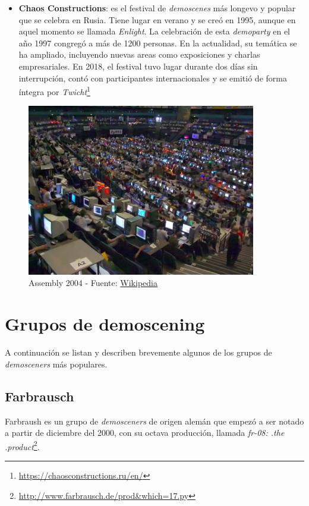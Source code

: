 \begin{itemize}
	\item \textbf{Chaos Constructions}: es el festival de \emph{demoscenes} más longevo y popular que se celebra en Rusia. Tiene lugar en verano y se creó en 1995, aunque en aquel momento se llamada \emph{Enlight}. La celebración de esta \emph{demoparty} en el año 1997 congregó a más de 1200 personas. En la actualidad, su temática se ha ampliado, incluyendo nuevas areas como exposiciones y charlas empresariales. En 2018, el festival tuvo lugar durante dos días sin interrupción, contó con participantes internacionales y se emitió de forma íntegra por \emph{Twicht}\footnote{\url{https://chaosconstructions.ru/en/}}
\end{itemize}

\begin{figure}[h]
	\centering
	\includegraphics[width=10cm]{archivos/Assembly2004}
	\caption{Assembly 2004 - Fuente: \href{https://en.wikipedia.org/wiki/Demoscene\#/media/File:Assembly2004-areena01.jpg}{Wikipedia}}
	\label{fig:assembly}
\end{figure}

\section{Grupos de demoscening}

A continuación se listan y describen brevemente algunos de los grupos de \emph{demosceners} más populares.

\subsection{Farbrausch}

Farbraush es un grupo de \emph{demosceners} de origen alemán que empezó a ser notado a partir de diciembre del 2000, con su octava producción, llamada \emph{fr-08: .the .product}\footnote{\url{http://www.farbrausch.de/prod&which=17.py}}.\\

